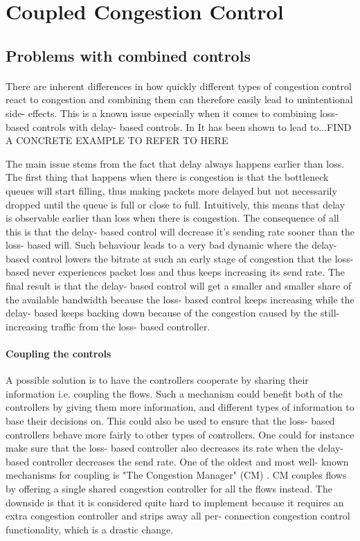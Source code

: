 \section{Coupled Congestion Control}
\subsection{Problems with combined controls}
\paragraph{}
There are inherent differences in how quickly different types of congestion control react to congestion and combining them can therefore easily lead to unintentional side- effects. 
This is a known issue especially when it comes to combining loss- based controls with delay- based controls.
In 
It has been shown to lead to...FIND A CONCRETE EXAMPLE TO REFER TO HERE 

The main issue stems from the fact that delay always happens earlier than loss.
The first thing that happens when there is congestion is that the bottleneck queues will start filling, thus making packets more delayed but not necessarily dropped until the queue is full or close to full.
Intuitively, this means that delay is observable earlier than loss when there is congestion.
The consequence of all this is that the delay- based control will decrease it's sending rate sooner than the loss- based will. 
Such behaviour leads to a very bad dynamic where the delay- based control lowers the bitrate at such an early stage of congestion that the loss- based never experiences packet loss and thus keeps increasing its send rate. 
The final result is that the delay- based control will get a smaller and smaller share of the available bandwidth because the loss- based control keeps increasing while the delay- based keeps backing down because of the congestion caused by the still- increasing traffic from the loss- based controller.
\paragraph{Coupling the controls}
A possible solution is to have the controllers cooperate by sharing their information i.e. coupling the flows.
Such a mechanism could benefit both of the controllers by giving them more information, and different types of information to base their decisions on. 
This could also be used to ensure that the loss- based controllers behave more fairly to other types of controllers.
One could for instance make sure that the loss- based controller also decreases its rate when the delay- based controller decreases the send rate.
One of the oldest and most well- known mechanisms for coupling is "The Congestion Manager" (CM) \cite{rfc3124}.
CM couples flows by offering a single shared congestion controller for all the flows instead.
The downside is that it is considered quite hard to implement because it requires an extra congestion controller and strips away all per- connection congestion control functionality, which is a drastic change.

